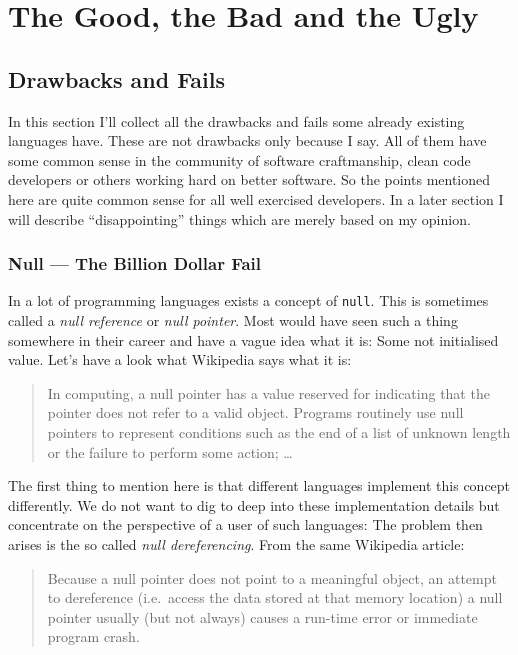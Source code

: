 \documentclass[11pt, a4paper]{report}
\begin{document}
\chapter{The Good, the Bad and the Ugly}


\section{Drawbacks and Fails}

In this section I'll collect all the drawbacks and fails some already existing languages have. These are not drawbacks only because I say. All of them have some common sense in the community of software craftmanship, clean code developers or others working hard on better software. So the points mentioned here are quite common sense for all well exercised developers. In a later section I will describe ``disappointing'' things which are merely based on my opinion.

\subsection{Null --- The Billion Dollar Fail}

In a lot of programming languages exists a concept of \texttt{null}. This is sometimes called a \textit{null reference} or \textit{null pointer}. Most would have seen such a thing somewhere in their career and have a vague idea what it is: Some not initialised value. Let's have a look what Wikipedia\cite{null-wiki} says what it is:

\begin{quotation}
    In computing, a null pointer has a value reserved for indicating that the pointer does not refer to a valid object. Programs routinely use null pointers to represent conditions such as the end of a list of unknown length or the failure to perform some action; \dots
\end{quotation}

The first thing to mention here is that different languages implement this concept differently. We do not want to dig to deep into these implementation details but concentrate on the perspective of a user of such languages: The problem then arises is the so called \textit{null dereferencing}. From the same Wikipedia\cite{null-wiki} article:

\begin{quotation}
    Because a null pointer does not point to a meaningful object, an attempt to dereference (i.e.\ access the data stored at that memory location) a null pointer usually (but not always) causes a run-time error or immediate program crash.
\end{quotation}
\end{document}
